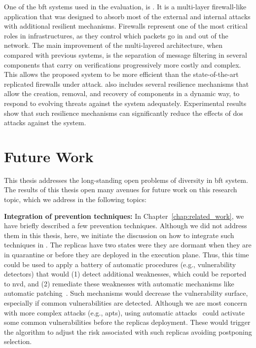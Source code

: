 One of the \gls{bft} systems used in the \system evaluation, is \sieveq. 
It is a multi-layer firewall-like application that was designed to absorb most of the external and internal attacks with additional resilient mechanisms.
Firewalls represent one of the most critical roles in infrastructures, as they control which packets go in and out of the network.
The main improvement of the \sieveq multi-layered architecture, when compared with previous systems, is the separation of message filtering in several components that carry on verifications progressively more costly and complex.
This allows the proposed system to be more efficient than the state-of-the-art replicated firewalls under attack.
\sieveq also includes several resilience mechanisms that allow the creation, removal, and recovery of components in a dynamic way, to respond to evolving threats against the system adequately. Experimental results show that such resilience mechanisms can significantly reduce the effects of \gls{dos} attacks against the system.



\section{Future Work}
This thesis addresses the long-standing open problems of diversity in \gls{bft} system.
The results of this thesis open many avenues for future work on this research topic, which we address in the following topics:


\textbf{Integration of prevention techniques:}
In Chapter~\ref{chap:related_work}, we have briefly described a few prevention techniques.
Although we did not address them in this thesis, here, we initiate the discussion on how to integrate such techniques in \system.
The \system replicas have two states were they are dormant when they are in quarantine or before they are deployed in the execution plane.
Thus, this time could be used to apply a battery of automatic procedures (e.g., vulnerability detectors) that would (1) detect additional weaknesses, which could be reported to \gls{nvd}, and (2) remediate these weaknesses with automatic mechanisms like automatic patching~\cite{Huang:2016}.
Such mechanisms would decrease the vulnerability surface, especially if common vulnerabilities are detected.
Although we are most concern with more complex attacks (e.g., \gls{apts}), using automatic attacks~\cite{Hu:2015} could activate some common vulnerabilities before the replicas deployment.
These would trigger the algorithm to adjust the risk associated with such replicas avoiding postponing selection.



